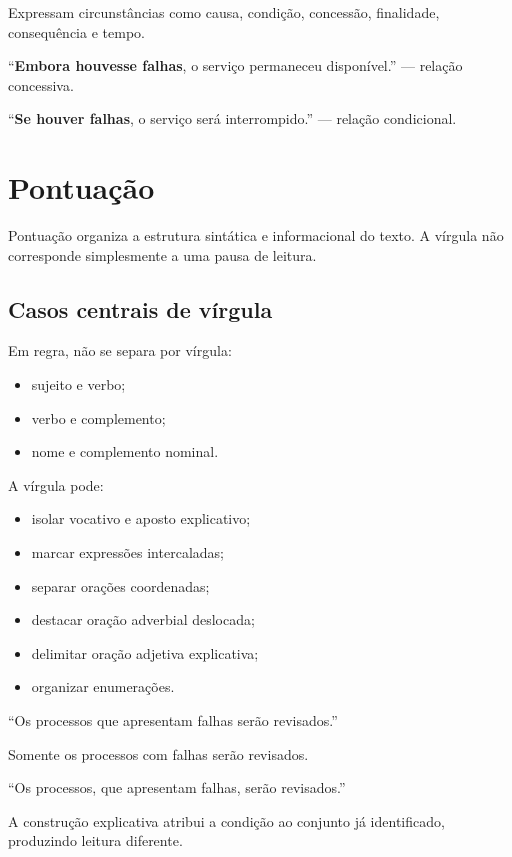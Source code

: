 Expressam circunstâncias como causa, condição, concessão, finalidade, consequência e tempo.

``\textbf{Embora houvesse falhas}, o serviço permaneceu disponível.'' — relação concessiva.

``\textbf{Se houver falhas}, o serviço será interrompido.'' — relação condicional.

\section{Pontuação}

Pontuação organiza a estrutura sintática e informacional do texto. A vírgula não corresponde simplesmente a uma pausa de leitura.

\subsection{Casos centrais de vírgula}

Em regra, não se separa por vírgula:
\begin{itemize}
\item sujeito e verbo;
\item verbo e complemento;
\item nome e complemento nominal.
\end{itemize}

A vírgula pode:
\begin{itemize}
\item isolar vocativo e aposto explicativo;
\item marcar expressões intercaladas;
\item separar orações coordenadas;
\item destacar oração adverbial deslocada;
\item delimitar oração adjetiva explicativa;
\item organizar enumerações.
\end{itemize}

\begin{exemplo}
``Os processos que apresentam falhas serão revisados.''

Somente os processos com falhas serão revisados.

``Os processos, que apresentam falhas, serão revisados.''

A construção explicativa atribui a condição ao conjunto já identificado, produzindo leitura diferente.
\end{exemplo}

